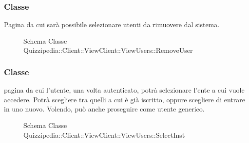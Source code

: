 \subsubsection{Classe }
Pagina da cui sarà possibile selezionare utenti da rimuovere dal sistema.
\begin{figure}[H]
\centering
\noindent{}
\caption[Schema Classe RemoveUser]{Schema Classe Quizzipedia::Client::ViewClient::ViewUsers::RemoveUser}
\end{figure}
\subsubsection{Classe }
pagina da cui l'utente, una volta autenticato, potrà selezionare l'ente a cui vuole accedere. Potrà scegliere tra quelli a cui è già iscritto, oppure scegliere di entrare in uno nuovo. Volendo, può anche proseguire come utente generico.
\begin{figure}[H]
\centering
\noindent{}
\caption[Schema Classe SelectInst]{Schema Classe Quizzipedia::Client::ViewClient::ViewUsers::SelectInst}
\end{figure}
